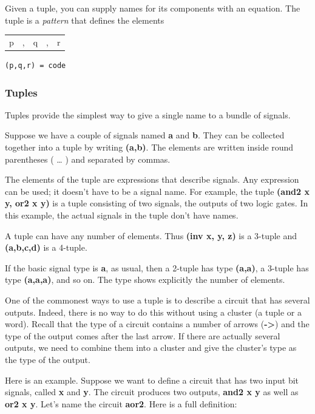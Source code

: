 \documentclass[]{svmono}
\begin{document}
Given a tuple, you can supply names for its components with an
equation.  The tuple is a \emph{pattern} that defines the elements
\begin{center}
\begin{tabular}{lllll}
p & , & q & , & r\\
\end{tabular}
\end{center}

\begin{verbatim}
(p,q,r) = code
\end{verbatim}
\subsubsection*{Tuples}
\label{sec:orgafb0cc7}

Tuples provide the simplest way to give a single name to a bundle of
signals.

Suppose we have a couple of signals named \textbf{a} and \textbf{b}.  They can be
collected together into a tuple by writing \textbf{(a,b)}.  The elements are
written inside round parentheses ( \ldots{} ) and separated by commas.

The elements of the tuple are expressions that describe signals.  Any
expression can be used; it doesn't have to be a signal name.  For
example, the tuple \textbf{(and2 x y, or2 x y)} is a tuple consisting of two
signals, the outputs of two logic gates.  In this example, the actual
signals in the tuple don't have names.

A tuple can have any number of elements.  Thus \textbf{(inv x, y, z)} is a
3-tuple and \textbf{(a,b,c,d)} is a 4-tuple.

If the basic signal type is \textbf{a}, as usual, then a 2-tuple has type
\textbf{(a,a)}, a 3-tuple has type \textbf{(a,a,a)}, and so on.  The type shows
explicitly the number of elements.

One of the commonest ways to use a tuple is to describe a circuit that
has several outputs.  Indeed, there is no way to do this without using
a cluster (a tuple or a word).  Recall that the type of a circuit
contains a number of arrows (\textbf{->}) and the type of the output comes
after the last arrow.  If there are actually several outputs, we need
to combine them into a cluster and give the cluster's type as the type
of the output.

Here is an example.  Suppose we want to define a circuit that has two
input bit signals, called \textbf{x} and \textbf{y}.  The circuit produces two
outputs, \textbf{and2 x y} as well as \textbf{or2 x y}.  Let's name the circuit
\textbf{aor2}.  Here is a full definition:
\end{document}
